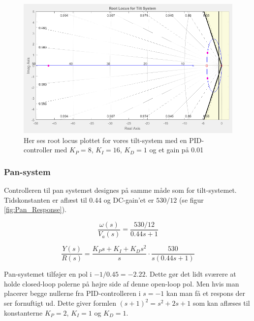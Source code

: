 \begin{figure}[ht]
	\begin{center}
		\includegraphics[scale=0.45]{Billeder/Tilt_Rlocus.PNG}
	\end{center}
\caption{Her ses root locus plottet for vores tilt-system med en PID-controller med $K_{P}=8$, $K_{I}=16$, $K_{D}=1$ og et gain på 0.01}
\label{fig:Tilt_rlocus}
\end{figure}

\subsubsection{Pan-system}

Controlleren til pan systemet designes på samme måde som for tilt-systemet. Tidskonstanten er aflæst til 0.44 og DC-gain'et er $530/12$ (se figur \ref{fig:Pan_Response}). 

\begin{equation}\label{eq:pan_tf}
\frac{\omega(s)}{V_{a}(s)}=\frac{530/12}{0.44s+1}
\end{equation}

\begin{equation}\label{eq:pan_ol_tf}
\frac{Y(s)}{R(s)}=\frac{K_{P}s+K_{I}+K_{D}s^2}{s}\cdot\frac{530}{s(0.44s+1)}
\end{equation}

Pan-systemet tilføjer en pol i $-1/0.45=-2.22$. Dette gør det lidt sværere at holde closed-loop polerne på højre side af denne open-loop pol. Men hvis man placerer begge nullerne fra PID-controlleren i $s=-1$ kan man få et respons der ser fornuftigt ud. Dette giver formlen $(s+1)^2=s^2+2s+1$ som kan aflæses til konstanterne $K_{P}=2$, $K_{I}=1$ og $K_{D}=1$. 

